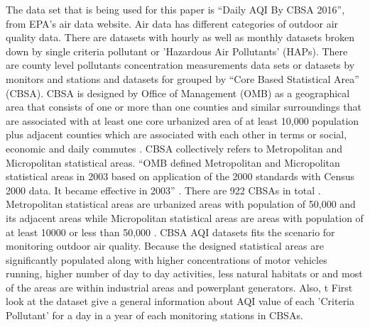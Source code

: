 \documentclass[sigconf]{acmart}
\begin{document}
{  The data set that is being used for this paper is ``Daily AQI By CBSA 2016'', from EPA's air data website. Air data has different categories of outdoor air quality data. There are datasets with hourly as well as monthly datasets broken down by single criteria pollutant or 'Hazardous Air Pollutants' (HAPs). There are county level pollutants concentration measurements data sets or datasets by monitors and stations and datasets for grouped by ``Core Based Statistical Area'' (CBSA).
  CBSA is designed by Office of Management (OMB) as a geographical area that consists of one or more than one counties and similar surroundings that are associated with at least one core urbanized area of at least 10,000 population plus adjacent counties which are associated with each other in terms or social, economic and daily commutes \cite{www-census-gov}. CBSA collectively refers to Metropolitan and Micropolitan statistical areas. ``OMB defined Metropolitan and Micropolitan statistical areas in 2003 based on application of the 2000 standards with Census 2000 data. It became effective in 2003'' \cite{www-census-gov}. There are 922 CBSAs in total \cite{www-census-gov}. Metropolitan statistical areas are urbanized areas with population of 50,000 and its adjacent areas  while Micropolitan statistical areas are areas with population of at least 10000 or less than 50,000 \cite{www-census-gov}.
  CBSA AQI datasets fits the scenario for monitoring outdoor air quality. Because the designed statistical areas are significantly populated along with higher concentrations of motor vehicles running, higher number of day to day activities, less natural habitats or and most of the areas are within industrial areas and powerplant generators. Also, t First look at the dataset give a general information about AQI value of each 'Criteria Pollutant' for a day in a year of each monitoring stations in CBSAs.
}
\end{document}
